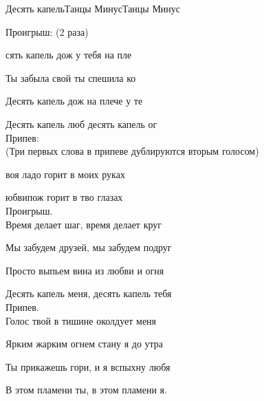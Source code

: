 \documentclass[11pt,a5paper]{book}
\renewcommand{\tt}{\indent \indent}
\begin{document}
\begin{song}{Десять капель}{}{Танцы Минус}{Танцы Минус}{}{}

Проигрыш: (2 раза)\par 
{}       

сять капель дож у тебя на пле\par
Ты забыла свой  ты спешила ко \par
Десять капель дож на плече у те\par
Десять капель люб десять капель ог\\

Припев:\\(Три первых слова в припеве дублируются вторым голосом)\par
\tt{}воя ладо горит в моих руках\par
\tt{}юбвипож горит в тво глазах\\

Проигрыш.\\

Время делает шаг, время делает круг\par
Мы забудем друзей, мы забудем подруг\par
Просто выпьем вина из любви и огня\par
Десять капель меня, десять капель тебя\\

Припев.\\

Голос твой в тишине околдует меня\par
Ярким жарким огнем стану я до утра\par
Ты прикажешь гори, и я вспыхну любя\par
В этом пламени ты, в этом пламени я.\par

\end{song}
\end{document}

